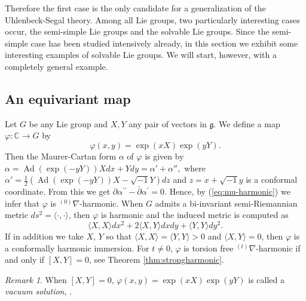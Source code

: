 \documentclass[12pt]{amsart}
\theoremstyle{definition}
\theoremstyle{remark}
\newtheorem{Remark}[Theorem]{Remark}
\numberwithin{equation}{section}
\begin{document}
 
 Therefore the first case is the only candidate 
 for a generalization of the Uhlenbeck-Segal theory.
 Among all Lie groups, two particularly interesting cases occur, 
 the semi-simple Lie groups and the solvable Lie groups. 
 Since the semi-simple case has been studied intensively already, 
 in this section we exhibit some interesting examples 
 of solvable Lie groups. 
 We will start, however, with a completely general example.

\subsection{An equivariant map}
 Let $G$ be any Lie group and $X,Y$ any pair of vectors in $\mathfrak{g}$.
 We define a map $\varphi:\mathbb{C}\to G$ by 
\begin{equation*}
\varphi(x,y)=\exp (xX)\exp(yY).
\end{equation*}
 Then the Maurer-Cartan form $\alpha$ of $\varphi$ is given by
 $\alpha ={\operatorname{Ad}} (\exp(-yY))X dx + Ydy  = \alpha' + \alpha'',$ where
 $\alpha' = \frac{1}{2}( {\operatorname{Ad}} (\exp(-yY))X -\sqrt{-1} Y)dz$ and $z = x + \sqrt{-1} y$ 
 is a conformal coordinate.
 From this we get 
 $\partial\alpha^{\prime \prime} 
 - \bar \partial \alpha^{\prime}=0$. 
 Hence, by  (\ref{eq:mu-harmonic})  we infer that $\varphi$ is ${{}^{(0)}\nabla}$-harmonic. 
 When $G$ admits a bi-invariant semi-Riemannian 
 metric $ds^2=\langle\cdot, \cdot\rangle$, then 
 $\varphi$ is harmonic and the induced metric is computed as
\begin{equation*}
 \langle X,X\rangle dx^2+2\langle X,Y \rangle dxdy+
 \langle Y,Y\rangle dy^2.
\end{equation*}
 If in addition we take $X$, $Y$ so that 
 $\langle X,X\rangle=\langle Y,Y\rangle>0$
 and $\langle X,Y\rangle=0$, then $\varphi$ 
 is a conformally harmonic immersion.
 For $t\not=0$, 
 $\varphi$ is torsion free ${}^{(t)}\nabla$-harmonic 
 if and only if $[X,Y]=0$, see
 Theorem \ref{thm:strongharmonic}.
\begin{Remark}
 When $[X, Y]=0$, $\varphi(x, y) = \exp (x X) \exp(y Y)$
 is called a {\it vacuum solution}, \cite{BP}.
\end{Remark}
\end{document}
